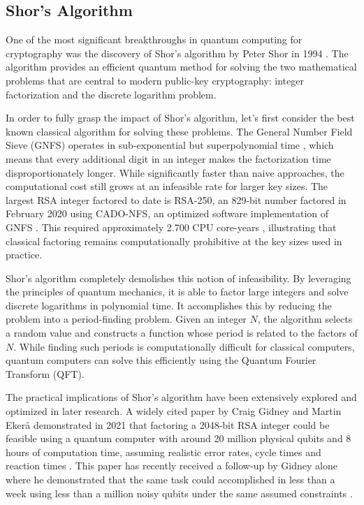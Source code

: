 \subsection{Shor's Algorithm}
One of the most significant breakthroughs in quantum computing for cryptography was the discovery of Shor's algorithm by Peter Shor in 1994 \cite{shors}. The algorithm provides an efficient quantum method for solving the two mathematical problems that are central to modern public-key cryptography: integer factorization and the discrete logarithm problem.

In order to fully grasp the impact of Shor's algorithm, let's first consider the best known classical algorithm for solving these problems. The General Number Field Sieve (GNFS) operates in sub-exponential but superpolynomial time \cite{GNFS}, which means that every additional digit in an integer makes the factorization time disproportionately longer. While significantly faster than naive approaches, the computational cost still grows at an infeasible rate for larger key sizes. The largest RSA integer factored to date is RSA-250, an 829-bit number factored in February 2020 using CADO-NFS, an optimized software implementation of GNFS \cite{CADO-NFS}. This required approximately \num{2,700} CPU core-years \cite{RSA250}, illustrating that classical factoring remains computationally prohibitive at the key sizes used in practice.

Shor's algorithm completely demolishes this notion of infeasibility. By leveraging the principles of quantum mechanics, it is able to factor large integers and solve discrete logarithms in polynomial time. It accomplishes this by reducing the problem into a period-finding problem. Given an integer $N$, the algorithm selects a random value and constructs a function whose period is related to the factors of $N$. While finding such periods is computationally difficult for classical computers, quantum computers can solve this efficiently using the Quantum Fourier Transform (QFT).

The practical implications of Shor's algorithm have been extensively explored and optimized in later research. A widely cited paper by Craig Gidney and Martin Ekerå demonstrated in 2021 that factoring a 2048-bit RSA integer could be feasible using a quantum computer with around 20 million physical qubits and 8 hours of computation time, assuming realistic error rates, cycle times and reaction times \cite{Gidney2021RSA2048}. This paper has recently received a follow-up by Gidney alone where he demonstrated that the same task could accomplished in less than a week using less than a million noisy qubits under the same assumed constraints \cite{Gidney2025RSA2048}.

